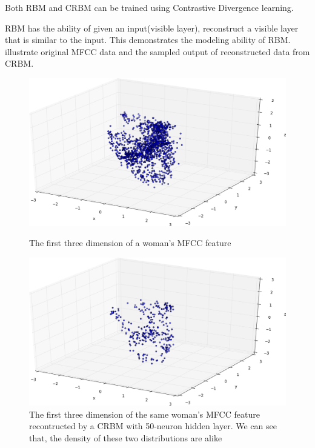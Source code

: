 \begin{enumerate}
			Both RBM and CRBM can be trained using Contrastive Divergence learning.

			RBM has the ability of given an input(visible layer), reconstruct a visible
			layer that is similar to the input. This demonstrates the modeling ability
			of RBM.  illustrate original MFCC data and the sampled output of
			reconstructed data from CRBM.
			\begin{figure}[!ht]
				\label{fig:crbm}
				\begin{minipage}{0.48\linewidth}
					\centering
					\includegraphics[width=\linewidth]{res/all.trimed.png}
					\caption{The first three dimension of a woman's MFCC feature}
				\end{minipage}
				\hfill
				\begin{minipage}{0.48\linewidth}
					\centering
					\includegraphics[width=\linewidth]{res/50.trimed.png}
					\caption{The first three dimension of the same woman's MFCC feature
					recontructed by a CRBM with 50-neuron hidden layer. We can
					see that, the density of these two distributions are alike}
				\end{minipage}
			\end{figure}


\end{enumerate}
